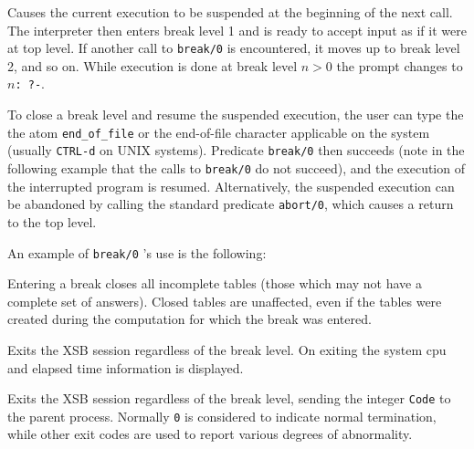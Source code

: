 \begin{description}

    Causes the current execution to be suspended at the beginning of the next 
    call.  The interpreter then enters break level 1 and is ready to accept
    input as if it were at top level.  If another call to {\tt break/0} is 
    encountered, it moves up to break level 2, and so on.  While execution 
    is done at break level $n>0$ the prompt changes to {\tt $n$: ?-}.

    To close a break level and resume the suspended execution, the user can 
    type the the atom {\tt end\_of\_file} or the end-of-file character 
    applicable on the system (usually {\tt CTRL-d} on UNIX systems).  
    Predicate {\tt break/0} 
    then succeeds (note in the following example that the calls to {\tt break/0}
    do not succeed), and the execution of the interrupted program is resumed.  
    Alternatively, the suspended execution can be abandoned by calling the 
    standard predicate {\tt abort/0}, which causes a return to the top level.

    An example of {\tt break/0} 's use is the following:


    Entering a break closes all incomplete tables (those which may not have a 
    complete set of answers).  Closed tables are unaffected, even if 
    the tables were created during the computation for which the break was
    entered.

    Exits the XSB session regardless of the break level.  On exiting
    the system cpu and elapsed time information is displayed.

%
Exits the XSB session regardless of the break level, sending the
integer {\tt Code} to the parent process.  Normally {\tt 0} is
considered to indicate normal termination, while other exit codes are
used to report various degrees of abnormality.


\end{description}
